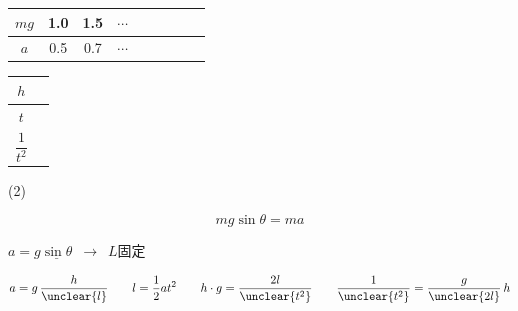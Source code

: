 
\begin{center}
\begin{tabular}{|c|c|c|c|c|c|c|c|c|}
\hline
$mg$ & 1.0 & 1.5 & $\cdots$ & & & & & \\
\hline
$a$ & 0.5 & 0.7 & $\cdots$ & & & & & \\
\hline
\end{tabular}
\end{center}
\begin{center}
\begin{tabular}{|c|p{6cm}|}
\hline
$h$ & \\
\hline
$t$ & \\
\hline
$\dfrac{1}{t^2}$ & \\
\hline
\end{tabular}
\end{center}


(2)




\[
mg\sin\theta=ma
\]

$a=g\underline{\sin\theta}$\ $\to$\ $L$固定\quad {} %


\[
a=g\,\frac{h}{\unclear{l}}\qquad l=\frac{1}{2}at^2\qquad h\cdot g=\frac{2l}{\unclear{t^2}}\qquad \frac{1}{\unclear{t^2}}=\frac{g}{\unclear{2l}}\,h
\]
